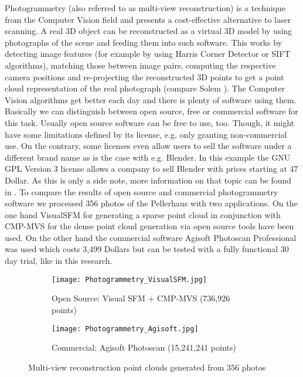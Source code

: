 Photogrammetry (also referred to as multi-view reconstruction) is a technique from the Computer Vision field and presents a cost-effective alternative to laser scanning. A real 3D object can be reconstructed as a virtual 3D model by using photographs of the scene and feeding them into such software. This works by detecting image features (for example by using Harris Corner Detector or SIFT algorithms), matching those between image pairs, computing the respective camera positions and re-projecting the reconstructed 3D points to get a point cloud representation of the real photograph (compare Solem \parencite[][p29]{bookProgrammingComputerVisionwithPython}).
The Computer Vision algorithms get better each day and there is plenty of software using them. Basically we can distinguish between open source, free or commercial software for this task. Usually open source software can be free to use, too. Though, it might have some limitations defined by its license, e.g. only granting non-commercial use. On the contrary, some licenses even allow users to sell the software under a different brand name as is the case with e.g. Blender. In this example the GNU GPL Version 3 license allows a company to sell Blender with prices starting at 47 Dollar. As this is only a side note, more information on that topic can be found in \parencite{blender_rebranding}.
To compare the results of open source and commercial photogrammetry software we processed 356 photos of the Pellerhaus with two applications. On the one hand VisualSFM for generating a sparse point cloud in conjunction with CMP-MVS for the dense point cloud generation via open source tools have been used. On the other hand the commercial software Agisoft Photoscan Professional was used which costs 3,499 Dollars but can be tested with a fully functional 30 day trial, like in this research.

\begin{figure}[h]
	\centering
	\begin{subfigure}[b]{1.0\textwidth}
		\centering
		\texttt{[image: Photogrammetry\_VisualSFM.jpg]}
		\caption{Open Source: Visual SFM + CMP-MVS (736,926 points)}
		\label{fig:visualsfm}
	\end{subfigure}
	\hfill
	\begin{subfigure}[b]{1.0\textwidth}
		\centering
		\texttt{[image: Photogrammetry\_Agisoft.jpg]}
		\caption{Commercial: Agisoft Photoscan (15,241,241 points)}
		\label{fig:photoscan}
	\end{subfigure}
	\caption{Multi-view reconstruction point clouds generated from 356 photos}
	\label{fig:multiview reconstruction pellerhaus}
\end{figure}

